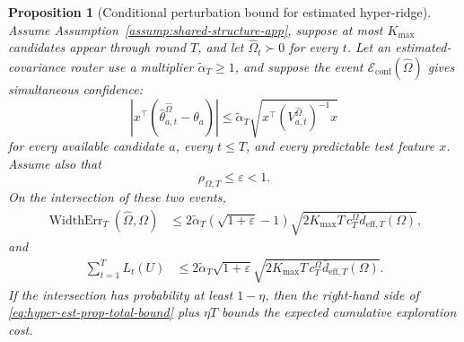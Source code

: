 \documentclass{article} %
\newtheorem{proposition}[theorem]{Proposition}
\begin{document}
\begin{proposition}[Conditional perturbation bound for estimated hyper-ridge]
\label{prop:hyper-estimated-perturbation}
Assume Assumption~\ref{assump:shared-structure-app}, suppose at most
\(K_{\max}\) candidates appear through round \(T\), and let
\(\widehat\Omega_t\succ0\) for every \(t\). Let an estimated-covariance router
use a multiplier \(\widetilde\alpha_T\ge1\), and suppose the event
\(\mathcal E_{\mathrm{conf}}(\widehat\Omega)\) gives simultaneous confidence:
\begin{equation}
\label{eq:hyper-est-prop-confidence}
\left|
x^\top
\left(
\widehat\theta_{a,t}^{\widehat\Omega}-\theta_a
\right)
\right|
\le
\widetilde\alpha_T
\sqrt{
x^\top
\left(V_{a,t}^{\widehat\Omega}\right)^{-1}
x
}
\end{equation}
for every available candidate \(a\), every \(t\le T\), and every predictable
test feature \(x\). Assume also that
\begin{equation}
\label{eq:hyper-est-prop-rho}
\rho_{\Omega,T}\le \varepsilon<1 .
\end{equation}
On the intersection of these two events,
\begin{align}
\label{eq:hyper-est-prop-err-bound}
\operatorname{WidthErr}_T(\widehat{\Omega},\Omega)
&\le
2\widetilde\alpha_T
\left(\sqrt{1+\varepsilon}-1\right)
\sqrt{
2K_{\max}T\,c_T^\Omega
\bar d_{\mathrm{eff},T}(\Omega)
},
\end{align}
and
\begin{align}
\label{eq:hyper-est-prop-total-bound}
\sum_{t=1}^{T}L_t(U)
&\le
2\widetilde\alpha_T\sqrt{1+\varepsilon}
\sqrt{
2K_{\max}T\,c_T^\Omega
\bar d_{\mathrm{eff},T}(\Omega)
}.
\end{align}
If the intersection has probability at least \(1-\eta\), then the right-hand
side of \eqref{eq:hyper-est-prop-total-bound} plus \(\eta T\) bounds the
expected cumulative exploration cost.
\end{proposition}
\end{document}
